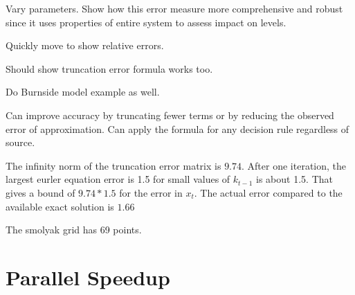 \documentclass[12pt]{article}
\begin{document}
Vary parameters.  Show how this error measure more comprehensive and robust
since it uses properties of entire system to assess impact on levels.

Quickly move to show relative errors.

Should show truncation error formula works too.

Do Burnside model example as well.

Can improve accuracy by truncating fewer terms or by reducing the observed 
error of approximation.  Can apply the formula for any decision rule regardless of source.

The infinity norm of the truncation error matrix is $9.74$.  After one iteration, the largest eurler equation error is 1.5 for small values of $k_{t-1}$ is about 1.5.  That gives a bound of $9.74*1.5$ for the error in $x_t$.  The actual error compared to the available exact solution is  $1.66$

The smolyak grid has 69 points.

\section{Parallel Speedup}
\label{sec:parallel-speedup}





  

\end{document}
